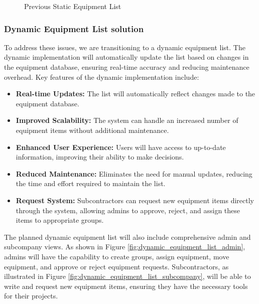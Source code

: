 \begin{figure}[H]
    \centering
    \caption{Previous Static Equipment List}
    \label{fig:static_equipment_list}
\end{figure}

\subsubsection{Dynamic Equipment List solution}
To address these issues, we are transitioning to a dynamic equipment list. The dynamic implementation will automatically update the list based on changes in the equipment database, ensuring real-time accuracy and reducing maintenance overhead. Key features of the dynamic implementation include:
\begin{itemize}
    \item \textbf{Real-time Updates:} The list will automatically reflect changes made to the equipment database.
    \item \textbf{Improved Scalability:} The system can handle an increased number of equipment items without additional maintenance.
    \item \textbf{Enhanced User Experience:} Users will have access to up-to-date information, improving their ability to make decisions.
    \item \textbf{Reduced Maintenance:} Eliminates the need for manual updates, reducing the time and effort required to maintain the list.
    \item \textbf{Request System:} Subcontractors can request new equipment items directly through the system, allowing admins to approve, reject, and assign these items to appropriate groups.
\end{itemize}

The planned dynamic equipment list will also include comprehensive admin and subcompany views. As shown in Figure \ref{fig:dynamic_equipment_list_admin}, admins will have the capability to create groups, assign equipment, move equipment, and approve or reject equipment requests. Subcontractors, as illustrated in Figure \ref{fig:dynamic_equipment_list_subcompany}, will be able to write and request new equipment items, ensuring they have the necessary tools for their projects.

